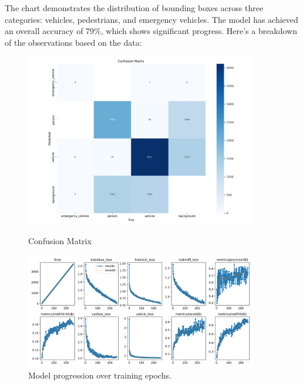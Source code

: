 \documentclass[usenatbib]{tjaa}
\begin{document}
The chart demonstrates the distribution of bounding boxes across three categories: vehicles, pedestrians, and emergency vehicles. The model has achieved an overall accuracy of 79\%, which shows significant progress. Here's a breakdown of the observations based on the data:
\begin{figure}
    \centering
    \begin{minipage}{0.5\textwidth}
        \centering
        \includegraphics[width=0.9\textwidth]{14.png}
        \caption{Confusion Matrix}
        \label{fig:f7}
    \end{minipage}%
    \hfill %
    \begin{minipage}{0.5\textwidth}
        \centering
        \includegraphics[width=0.9\textwidth]{15.png}
        \caption{Model progression over training epochs.}
        \label{fig:f8}
    \end{minipage}
\end{figure}
\end{document}
